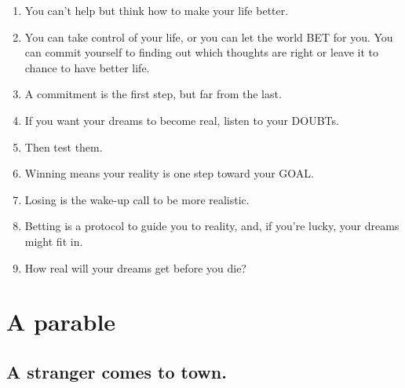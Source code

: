 \documentclass[
]{book}
\providecommand{\tightlist}{%
  \setlength{\itemsep}{0pt}\setlength{\parskip}{0pt}}
\begin{document}
\begin{enumerate}
\def\labelenumi{\arabic{enumi}.}
\tightlist
\item
  You can't help but think how to make your life better.
\item
  You can take control of your life, or you can let the world BET for you.
  You can commit yourself to finding out which thoughts are right or
  leave it to chance to have better life.
\item
  A commitment is the first step, but far from the last.
\item
  If you want your dreams to become real, listen to your DOUBTs.
\item
  Then test them.
\item
  Winning means your reality is one step toward your GOAL.
\item
  Losing is the wake-up call to be more realistic.
\item
  Betting is a protocol to guide you to reality, and, if you're lucky, your
  dreams might fit in.
\item
  How real will your dreams get before you die?
\end{enumerate}

\hypertarget{a-parable}{%
\section{A parable}\label{a-parable}}

\hypertarget{a-stranger-comes-to-town.}{%
\subsection{A stranger comes to town.}\label{a-stranger-comes-to-town.}}
\end{document}

